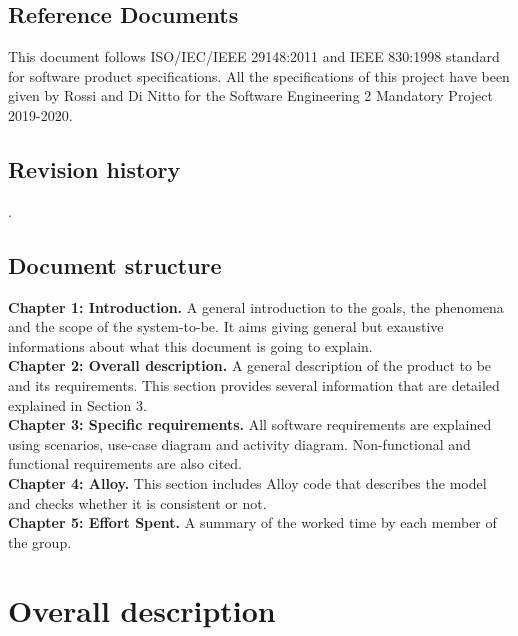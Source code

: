 \documentclass[a4paper, hidelinks, 12pt]{report}
\begin{document}
	\section{Reference Documents}\label{sec:reference-documents}
        This document follows ISO/IEC/IEEE 29148:2011 and IEEE 830:1998  standard for software product specifications.
        All the specifications of this project have been given by Rossi and Di Nitto for the Software Engineering 2 Mandatory Project 2019-2020.

	\section{Revision history}\label{sec:revision-history}
	.

	\section{Document structure}\label{sec:document-structure}
        \textbf{Chapter 1: Introduction.} A general introduction to the goals, the phenomena and the scope of the system-to-be. It aims giving general but exaustive informations about what this document is going to explain.
        \\
        \textbf{Chapter 2: Overall description.} A general description of the product to be and its requirements. This section provides several information that are detailed explained in Section 3.
        \\
        \textbf{Chapter 3: Specific requirements.} All software requirements are explained using scenarios, use-case diagram and activity diagram. Non-functional and functional requirements are also cited.
        \\
        \textbf{Chapter 4: Alloy.} This section includes Alloy code that describes the model and checks whether it is consistent or not.
        \\
        \textbf{Chapter 5: Effort Spent.} A summary of the worked time by each member of the group.

	\chapter{Overall description}\label{ch:overall-description}
\end{document}

